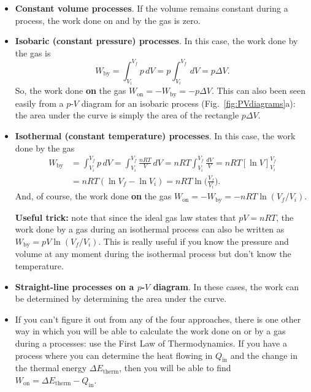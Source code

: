 \begin{itemize}
\item {\bf Constant volume processes}.  If the volume remains constant during a
process, the work done on and by the gas is zero.

\item {\bf Isobaric (constant pressure) processes}. In this case, the
  work done by the gas is
\begin{equation}
W_\text{by} = \int_{V_i}^{V_f}p\,dV = p\int_{V_i}^{V_f}\,dV = p\Delta V.
\end{equation}
So, the work done {\bf on} the gas $W_\text{on} = -W_\text{by} =
-p\Delta V$.  This can also been seen easily from a $p$-$V$ diagram
for an isobaric process (Fig.~\ref{fig:PVdiagrams}a): the area under
the curve is simply the area of the rectangle $p\Delta V$.

\item {\bf Isothermal (constant temperature) processes}. In this case,
  the work done by the gas 
\begin{align}
  W_\text{by} &= \int_{V_i}^{V_f}p\,dV =
  \int_{V_i}^{V_f}\frac{nRT}{V}\,dV = nRT\int_{V_i}^{V_f}\frac{dV}{V} 
= nRT[\ln V]_{V_i}^{V_f}  \nonumber\\
  &= nRT( \ln V_f -\ln V_i)
  = nRT\ln\biggl(\frac{V_f}{V_i}\biggr).
\end{align}
 And, of course, the work done {\bf on} the gas $W_\text{on} =
 -W_\text{by} = -nRT\ln (V_f/V_i)$.

{\bf Useful trick:} note that since the ideal gas law states that $pV = nRT$, the work done by 
a gas during an isothermal process can also be written as $W_\text{by}
= pV\ln (V_f/V_i)$. This is really useful if you know the pressure
and volume at any moment during the isothermal process but don't know
the temperature.

\item {\bf Straight-line processes on a $p$-$V$ diagram}. In these cases, the work
can be determined by determining the area under the curve. 

\item If you can't figure it out from any of the four approaches, there is
one other way in which you will be able to calculate the work done on
or by a gas during a processes: use the First Law of Thermodynamics.
If you have a process where you can determine the heat flowing in $Q_\text{in}$
and the change in the thermal energy $\Delta E_\text{therm}$, then you will be able
to find $W_\text{on} = \Delta E_\text{therm} - Q_\text{in}$.

\end{itemize}

